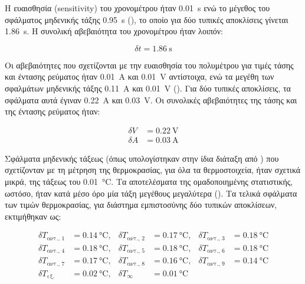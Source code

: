 \noindent Η ευαισθησία (sensitivity) του χρονομέτρου ήταν \qty{0.01}{\second} ενώ το μέγεθος του σφάλματος μηδενικής τάξης \qty{0.95}{\second} (), το οποίο για δύο τυπικές αποκλίσεις γίνεται \qty{1.86}{\second}. Η συνολική αβεβαιότητα του χρονομέτρου ήταν λοιπόν:

\begin{equation*}
\delta t = \qty{1.86}{\second}
\end{equation*}

\noindent Οι αβεβαιότητες που σχετίζονται με την ευαισθησία του πολυμέτρου για τιμές τάσης και έντασης ρεύματος ήταν \qty{0.01}{\ampere} και \qty{0.01}{\volt} αντίστοιχα, ενώ τα μεγέθη των σφαλμάτων μηδενικής τάξης \qty{0.11}{\ampere} και \qty{0.01}{\volt} (). Για δύο τυπικές αποκλίσεις, τα σφάλματα αυτά έγιναν \qty{0.22}{\ampere} και \qty{0.03}{\volt}. Οι συνολικές αβεβαιότητες της τάσης και της έντασης ρεύματος ήταν:

\begin{align*}
\delta V &= \qty{0.22}{\volt}\\
\delta A &= \qty{0.03}{\ampere}
\end{align*}

\noindent Σφάλματα μηδενικής τάξεως (όπως υπολογίστηκαν στην ίδια διάταξη από \citeauthor{2019_Serbes_THESIS} \cite{2019_Serbes_THESIS}) που σχετίζονταν με τη μέτρηση της θερμοκρασίας, για όλα τα θερμοστοιχεία, ήταν σχετικά μικρά, της τάξεως του \qty{0.01}{\degreeCelsius}. Τα αποτελέσματα της ομαδοποιημένης στατιστικής, ωστόσο, ήταν κατά μέσο όρο μία τάξη μεγέθους μεγαλύτερα (). Τα τελικά σφάλματα των τιμών θερμοκρασίας, για διάστημα εμπιστοσύνης δύο τυπικών αποκλίσεων, εκτιμήθηκαν ως:

\begin{align*}
\delta T_{\text{αντ., 1}} &= \qty{0.14}{\degreeCelsius}, & \delta T_{\text{αντ., 2}} &= \qty{0.17}{\degreeCelsius}, & \delta T_{\text{αντ., 3}} &= \qty{0.18}{\degreeCelsius}\\
\delta T_{\text{αντ., 4}} &= \qty{0.18}{\degreeCelsius}, & \delta T_{\text{αντ., 5}} &= \qty{0.18}{\degreeCelsius}, & \delta T_{\text{αντ., 6}} &= \qty{0.18}{\degreeCelsius}\\
\delta T_{\text{αντ., 7}} &= \qty{0.17}{\degreeCelsius}, & \delta T_{\text{αντ., 8}} &= \qty{0.16}{\degreeCelsius}, & \delta T_{\text{αντ., 9}} &= \qty{0.14}{\degreeCelsius}\\
\delta T_{\text{εξ.}} &= \qty{0.02}{\degreeCelsius}, & \delta T_{\infty} &= \qty{0.01}{\degreeCelsius}
\end{align*}

